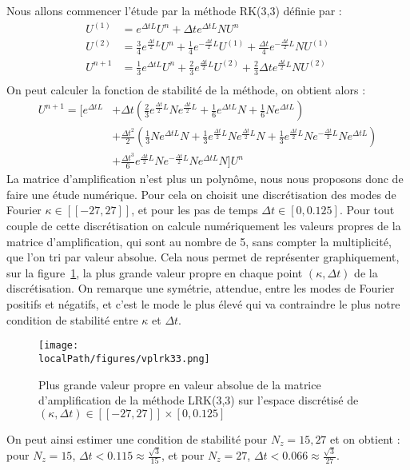 Nous allons commencer l'étude par la méthode RK(3,3) définie par :
$$
  \begin{aligned}
    U^{(1)} &= e^{\Delta tL}U^n + \Delta te^{\Delta tL}NU^n \\
    U^{(2)} &= \frac{3}{4}e^{\frac{\Delta t}{2}L}U^n + \frac{1}{4}e^{-\frac{\Delta t}{2}L}U^{(1)} + \frac{\Delta t}{4}e^{-\frac{\Delta t}{2}L}NU^{(1)} \\
    U^{n+1} &= \frac{1}{3}e^{\Delta tL}U^n + \frac{2}{3}e^{\frac{\Delta t}{2}L}U^{(2)} + \frac{2}{3}\Delta te^{\frac{\Delta t}{2}L}NU^{(2)} \\
  \end{aligned}
$$
On peut calculer la fonction de stabilité de la méthode, on obtient alors :
$$
  \begin{aligned}
    U^{n+1} = \Big[ e^{\Delta tL} &+ \Delta t\left(\frac{2}{3}e^{\frac{\Delta t}{2}L}Ne^{\frac{\Delta t}{2}L}+\frac{1}{6}e^{\Delta tL}N + \frac{1}{6}Ne^{\Delta tL}\right) \\
    & + \frac{\Delta t^2}{2}\left(\frac{1}{3}Ne^{\Delta tL}N + \frac{1}{3}e^{\frac{\Delta t}{2}L}Ne^{\frac{\Delta t}{2}L}N + \frac{1}{3} e^{\frac{\Delta t}{2}L}Ne^{-\frac{\Delta t}{2}L}Ne^{\Delta tL} \right) \\
    & + \frac{\Delta t^3}{6}e^{\frac{\Delta t}{2}L}Ne^{-\frac{\Delta t}{2}L}Ne^{\Delta tL}N \Big]U^n
  \end{aligned}
$$
La matrice d'amplification n'est plus un polynôme, nous nous proposons donc de faire une étude numérique. Pour cela on choisit une discrétisation des modes de Fourier $\kappa\in[\![-27,27]\!]$, et pour les pas de temps $\Delta t\in[0,0.125]$. Pour tout couple de cette discrétisation on calcule numériquement les valeurs propres de la matrice d'amplification, qui sont au nombre de 5, sans compter la multiplicité, que l'on tri par valeur absolue. Cela nous permet de représenter graphiquement, sur la figure~\ref{fig:3:vplrk33}, la plus grande valeur propre en chaque point $(\kappa,\Delta t)$ de la discrétisation. On remarque une symétrie, attendue, entre les modes de Fourier positifs et négatifs, et c'est le mode le plus élevé qui va contraindre le plus notre condition de stabilité entre $\kappa$ et $\Delta t$.
\begin{figure}[h]
  \centering
  \texttt{[image: \\localPath/figures/vplrk33.png]}
  \caption{Plus grande valeur propre en valeur absolue de la matrice d'amplification de la méthode LRK(3,3) sur l'espace discrétisé de $(\kappa,\Delta t)\in[\![-27,27]\!]\times[0,0.125]$}
  \label{fig:3:vplrk33}
\end{figure}
On peut ainsi estimer une condition de stabilité pour $N_z = 15,27$ et on obtient : pour $N_z = 15$, $\Delta t <0.115 \approx \frac{\sqrt{3}}{15}$, et pour $N_z = 27$, $\Delta t <0.066 \approx \frac{\sqrt{3}}{27}$.

